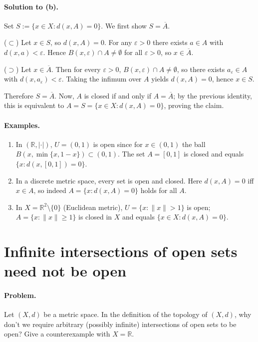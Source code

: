 \documentclass[12pt,a4paper]{article}
\begin{document}
	\bigskip
	
	\paragraph{Solution to (b).}
	Set $S:=\{x\in X: d(x,A)=0\}$. We first show $S=\overline{A}$.
	
	\smallskip
	\noindent
	($\subset$) Let $x\in S$, so $d(x,A)=0$. For any $\varepsilon>0$ there exists $a\in A$ with $d(x,a)<\varepsilon$. Hence $B(x,\varepsilon)\cap A\neq\emptyset$ for all $\varepsilon>0$, so $x\in\overline{A}$.
	
	\smallskip
	\noindent
	($\supset$) Let $x\in\overline{A}$. Then for every $\varepsilon>0$, $B(x,\varepsilon)\cap A\neq\emptyset$, so there exists $a_\varepsilon\in A$ with $d(x,a_\varepsilon)<\varepsilon$. Taking the infimum over $A$ yields $d(x,A)=0$, hence $x\in S$.
	
	\smallskip
	Therefore $S=\overline{A}$. Now, $A$ is closed if and only if $A=\overline{A}$; by the previous identity, this is equivalent to $A=S=\{x\in X: d(x,A)=0\}$, proving the claim.
	
	\bigskip
	
	\paragraph{Examples.}
	\begin{enumerate}
		\item In $(\mathbb{R},|\cdot|)$, $U=(0,1)$ is open since for $x\in(0,1)$ the ball $B\!\left(x,\min\{x,1-x\}\right)\subset(0,1)$. The set $A=[0,1]$ is closed and equals $\{x: d(x,[0,1])=0\}$.
		\item In a discrete metric space, every set is open and closed. Here $d(x,A)=0$ iff $x\in A$, so indeed $A=\{x: d(x,A)=0\}$ holds for all $A$.
		\item In $X=\mathbb{R}^2\setminus\{0\}$ (Euclidean metric), $U=\{x:\|x\|>1\}$ is open; $A=\{x:\|x\|\ge1\}$ is closed in $X$ and equals $\{x\in X: d(x,A)=0\}$.
	\end{enumerate}
	
\section*{Infinite intersections of open sets need not be open}

\paragraph{Problem.}
Let $(X,d)$ be a metric space. In the definition of the topology of $(X,d)$, why don’t we require arbitrary (possibly infinite) intersections of open sets to be open? Give a counterexample with $X=\mathbb{R}$.
\end{document}

